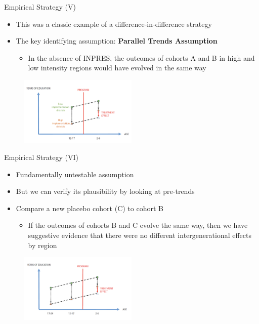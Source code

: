 \documentclass[11pt,notes=hide,aspectratio=169,mathserif]{beamer}
\begin{document}
\begin{frame}{Empirical Strategy (V)}
\begin{itemize}
    \item This was a classic example of a difference-in-difference strategy
    \item  The key identifying assumption: \textbf{Parallel Trends Assumption}
    \begin{itemize}
        \item   In the absence of INPRES, the outcomes of cohorts A and B in high and low intensity regions would have evolved in the same way
    \end{itemize}
\end{itemize}
\begin{figure}
    \centering
    \includegraphics[width=0.5\textwidth]{inputs/diagram1.png}
\end{figure}
\end{frame}

\begin{frame}{Empirical Strategy (VI)}
\begin{itemize}
    \item Fundamentally untestable assumption
    \item  But we can verify its plausibility by looking at pre-trends 
    \item Compare a new placebo cohort (C) to cohort B
    \begin{itemize}
        \item  If the outcomes of cohorts B and C evolve the same way, then we have suggestive evidence that there were no different intergenerational effects by region 
    \end{itemize}
\end{itemize}
{
\begin{figure}
    \centering
    \includegraphics[width=0.5\textwidth]{inputs/diagram2.png}
\end{figure}
}
\end{frame}
\end{document}
